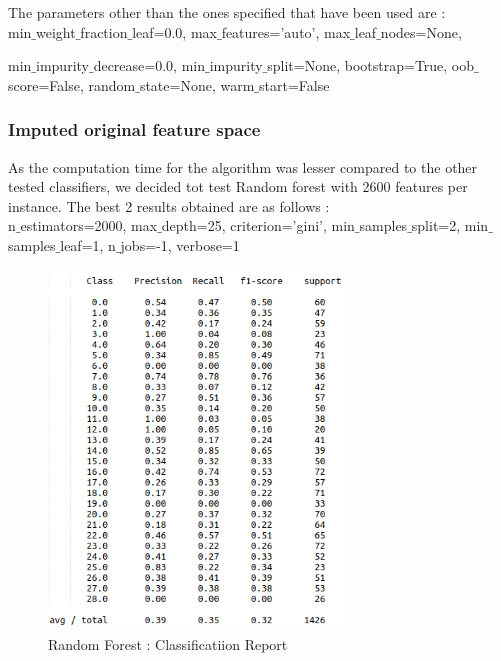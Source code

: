 \documentclass[12pt]{report}
\begin{document}
The parameters other than the ones specified that have been used are :\\

 min$\_$weight$\_$fraction$\_$leaf=0.0, max$\_$features='auto', max$\_$leaf$\_$nodes=None, 
 
 min$\_$impurity$\_$decrease=0.0, min$\_$impurity$\_$split=None, bootstrap=True, oob$\_$score=False, random$\_$state=None, warm$\_$start=False
 
 
\newpage
\subsubsection{Imputed original feature space}
As the computation time for the algorithm was lesser compared to the other tested classifiers, we decided tot test Random forest with 2600 features per instance. The best 2 results obtained are as follows :\\

n$\_$estimators=2000, max$\_$depth=25, criterion='gini', min$\_$samples$\_$split=2, min$\_$samples$\_$leaf=1, n$\_$jobs=-1, verbose=1
\begin{figure}[H]
  \centering
  \includegraphics[width=0.7\textwidth]{Images/rf3.png}
  \caption{Random Forest : Classificatiion Report}
\end{figure}
\end{document}
